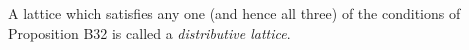 A lattice which satisfies any one (and hence all three) of the conditions of Proposition B32 is called a \textit{distributive lattice}.

